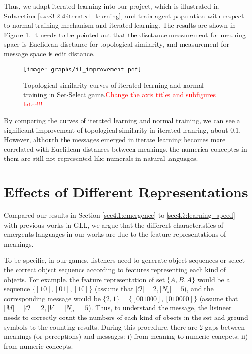Thus, we adapt iterated learning into our project, which is illustrated in Subsection \ref{ssec3.2.4:iterated_learning}, and train agent population with respect to normal training mechanism and iterated learning. The results are shown in Figure \ref{fig4.4:il_improve}. It needs to be pointed out that the disctance measurement for meaning space is Euclidean disctance for topological similarity, and measurement for message space is edit distance.

\begin{figure}[!h]
    \centering
    \texttt{[image: graphs/il\_improvement.pdf]}
    \caption{Topological similarity curves of iterated learning and normal training in Set-Select game.\textcolor{red}{Change the axis titles and subfigures later!!!}}
    \label{fig4.4:il_improve}
\end{figure}

By comparing the curves of iterated learning and normal training, we can see a significant improvement of topological similarity in iterated leanring, about $0.1$. However, althouth the messages emerged in iterate learning becomes more correlated with Euclidean distances between meanings, the numerica conceptes in them are still not represented like numerals in natural languages.

\section{Effects of Different Representations}
\label{sec4.4:represent_effect}

Compared our results in Section \ref{sec4.1:emergence} to \ref{sec4.3:learning_speed} with previous works in GLL, we argue that the different characteristics of emergents languages in our works are due to the feature representations of meanings.

To be specific, in our games, listeners need to generate object sequences or select the correct object sequence according to features representing each kind of objects. For example, the feature representation of set $\{A, B, A\}$ would be a sequence $\{[1 0], [0 1], [1 0]\}$ (assume that $|\mathcal{O}|=2, |N_o|=5$), and the corresponding message would be $\{2, 1\}=\{[0 0 1 0 0 0], [0 1 0 0 0 0]\}$ (assume that $|M|=|\mathcal{O}|=2, |V|=|N_o|=5$). Thus, to understand the message, the listneer needs to correctly count the numbers of each kind of obects in the set and ground symbols to the counting results. During this procedure, there are 2 gaps between meanings (or perceptions) and messages: i) from meaning to numeric concpets; ii) from numeric concepts.

